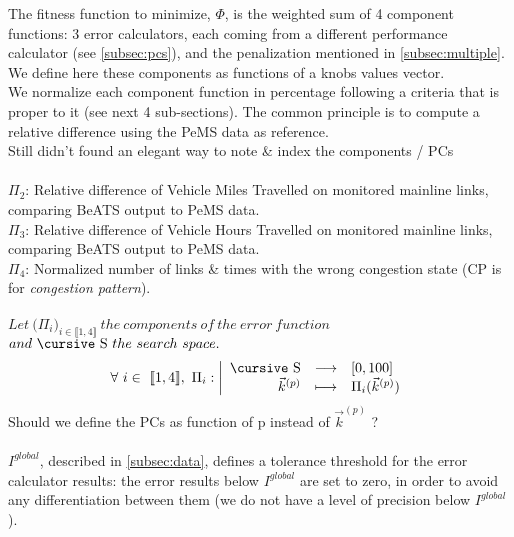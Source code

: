 The fitness function to minimize, $\Phi$, is the weighted sum of 4 component functions: 3 error calculators, each coming from a different performance calculator (see \ref{subsec:pcs}), and the penalization mentioned in \ref{subsec:multiple}.\\
We define here these components as functions of a knobs values vector.\\
We normalize each component function in percentage following a criteria that is proper to it (see next 4 sub-sections). The common principle is to compute a relative difference using the PeMS data as reference.\\

 	\color{red}
Still didn't found an elegant way to note \& index the components / PCs\color{black}\\
\\
$\Pi_{2}$: Relative difference of Vehicle Miles Travelled on monitored mainline links, comparing BeATS output to PeMS data.\\
$\Pi_{3}$: Relative difference of Vehicle Hours Travelled on monitored mainline links, comparing BeATS output to PeMS data.\\
$\Pi_{4}$: Normalized number of links \& times with the wrong congestion state (CP is for \emph{congestion pattern}).\\
\\
$Let\ \big(\Pi_{i})_{i\in\llbracket 1, 4 \rrbracket}\ the\ components\ of\ the\ error\ function$\\
$and\ \text{\cursive S}\ the\ search\ space.$\\
\begin{displaymath}
		\forall\ i\in\ \llbracket 1,4 \rrbracket,\ \Pi_{i}:
		\left|
  		\begin{array}{rcl}
    	\text{\cursive S} & \longrightarrow &[0,100] \\
    	\vec{k}^{(p)} & \longmapsto & \Pi_{i}(\vec{k}^{(p)}) \\
  	\end{array}
	\right.
	\end{displaymath}
\color{red}Should we define the PCs as function of p instead of $\vec{k}^{(p)}$ ?\color{black}\\
\\
$I^{global}$, described in \ref{subsec:data}, defines a tolerance threshold for the error calculator results: the error results below $I^{global}$ are set to zero, in order to avoid any differentiation between them (we do not have a level of precision below $I^{global}$).
